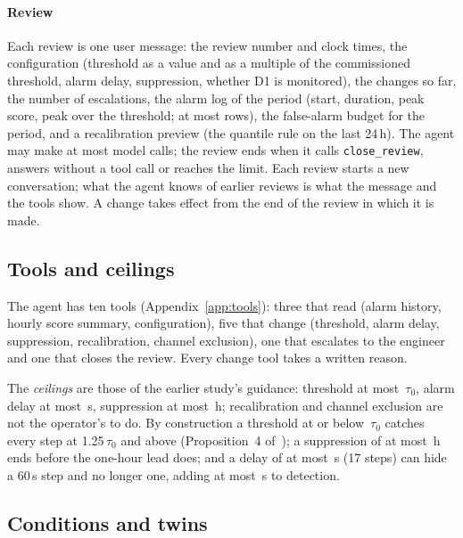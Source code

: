 \documentclass[sigconf]{acmart}
\newcommand{\tauz}{\ensuremath{\tau_0}}
\begin{document}
\paragraph{Review}
Each review is one user message: the review number and clock times, the configuration (threshold as a
value and as a multiple of the commissioned threshold, alarm delay, suppression, whether D1 is monitored),
the changes so far, the number of escalations, the alarm log of the period (start, duration, peak score,
peak over the threshold; at most \VLogRows{} rows), the false-alarm budget for the period, and a
recalibration preview (the quantile rule on the last 24\,h). The agent may make at most \VMaxCalls{} model
calls; the review ends when it calls \texttt{close\_review}, answers without a tool call or reaches the
limit. Each review starts a new conversation; what the agent knows of earlier reviews is what the message
and the tools show. A change takes effect from the end of the review in which it is made.

\subsection{Tools and ceilings}

The agent has ten tools (Appendix~\ref{app:tools}): three that read (alarm history, hourly score summary,
configuration), five that change (threshold, alarm delay, suppression, recalibration, channel exclusion),
one that escalates to the engineer and one that closes the review. Every change tool takes a written
reason.

The \emph{ceilings} are those of the earlier study's guidance: threshold at most \VCeilThr\,\tauz{}, alarm
delay at most \VCeilDelay\,s, suppression at most \VCeilSup\,h; recalibration and channel exclusion are
not the operator's to do. By construction a threshold at or below \VCeilThr\,\tauz{} catches every step
at 1.25\,\tauz{} and above (Proposition~4 of~\cite{kulshrestha2026tt1}); a suppression of at most
\VCeilSup\,h ends before the one-hour lead does; and a delay of at most \VCeilDelay\,s (17 steps) can hide
a 60\,s step and no longer one, adding at most \VAddedCeil\,s to detection.

\subsection{Conditions and twins}
\end{document}
